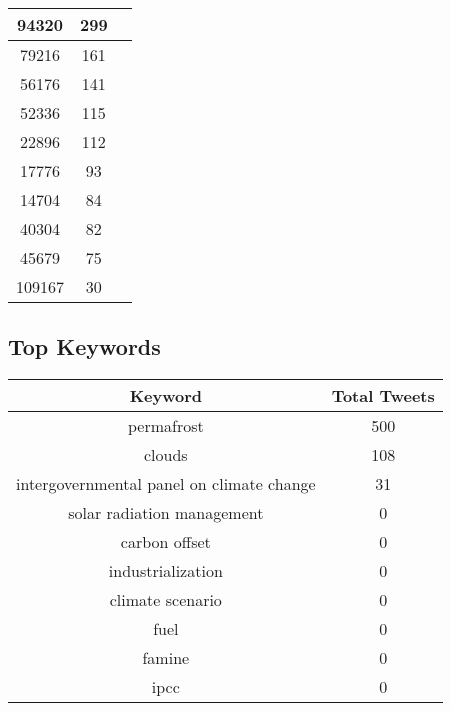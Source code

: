 \documentclass{article}\usepackage[T1]{fontenc}
\begin{document}
\begin{tabular}{|c|c|c|}
 \hline
94320 & 299\\ 
 \hline
79216 & 161\\ 
 \hline
56176 & 141\\ 
 \hline
52336 & 115\\ 
 \hline
22896 & 112\\ 
 \hline
17776 & 93\\ 
 \hline
14704 & 84\\ 
 \hline
40304 & 82\\ 
 \hline
45679 & 75\\ 
 \hline
109167 & 30\\ 
 \hline
\end{tabular}\subsection*{Top Keywords}\begin{tabular}{|c|c|}         \hline         Keyword & Total Tweets \\ 
 \hline
permafrost & 500\\ 
 \hline
clouds & 108\\ 
 \hline
intergovernmental panel on climate change & 31\\ 
 \hline
solar radiation management & 0\\ 
 \hline
carbon offset & 0\\ 
 \hline
industrialization & 0\\ 
 \hline
climate scenario & 0\\ 
 \hline
fuel & 0\\ 
 \hline
famine & 0\\ 
 \hline
ipcc & 0\\ 
 \hline
\end{tabular}
\end{document}
